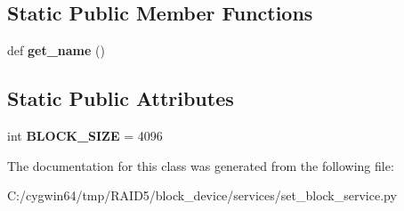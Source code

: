 \subsection*{Static Public Member Functions}
\begin{DoxyCompactItemize}
\item 
\mbox{\label{class_r_a_i_d5_1_1block__device_1_1services_1_1set__block__service_1_1_set_block_service_a8278d215309ac794164fa430a9727cc2}} 
def {\bfseries get\+\_\+name} ()
\end{DoxyCompactItemize}
\subsection*{Static Public Attributes}
\begin{DoxyCompactItemize}
\item 
\mbox{\label{class_r_a_i_d5_1_1block__device_1_1services_1_1set__block__service_1_1_set_block_service_a76542b83dd89294eb6bebd5b56b4eb91}} 
int {\bfseries B\+L\+O\+C\+K\+\_\+\+S\+I\+ZE} = 4096
\end{DoxyCompactItemize}


The documentation for this class was generated from the following file\+:\begin{DoxyCompactItemize}
\item 
C\+:/cygwin64/tmp/\+R\+A\+I\+D5/block\+\_\+device/services/set\+\_\+block\+\_\+service.\+py\end{DoxyCompactItemize}
